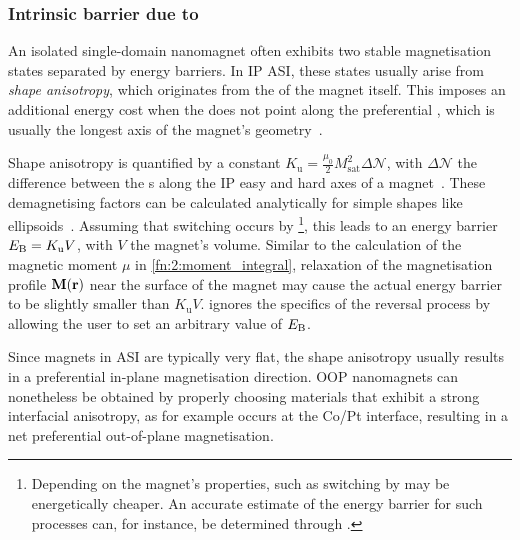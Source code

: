 \subsubsection{Intrinsic barrier due to }\label{sec:2:shape_anisotropy}
An isolated single-domain nanomagnet often exhibits two stable magnetisation states separated by energy barriers.
In IP ASI, these states usually arise from \textit{shape anisotropy}, which originates from the  of the magnet itself.
This imposes an additional energy cost when the  does not point along the preferential , which is usually the longest axis of the magnet's geometry~\cite{PhD_Leliaert}. \par
Shape anisotropy is quantified by a  constant $K_\mathrm{u} = \frac{\mu_0}{2} M_\mathrm{sat}^2 \Delta \mathcal{N}$, with $\Delta \mathcal{N}$ the difference between the s along the IP easy and hard axes of a magnet~\cite{AdvancesASI,VogelFulcherTammannFreezing,andersson2016thermally}. %
These demagnetising factors can be calculated analytically for simple shapes like ellipsoids~\cite{EllipsoidDemag,EllipseDemag}.
Assuming that switching occurs by \footnote{
	Depending on the magnet's properties,  such as switching by  may be energetically cheaper.
	An accurate estimate of the energy barrier for such processes can, for instance, be determined through .
}, this leads to an energy barrier $E_\mathrm{B} = K_\mathrm{u} V$, with $V$ the magnet's volume.
Similar to the calculation of the magnetic moment $\mu$ in \cref{fn:2:moment_integral}, relaxation of the magnetisation profile $\boldsymbol{\mathbf{M}}(\boldsymbol{\mathbf{r}})$ near the surface of the magnet may cause the actual energy barrier to be slightly smaller than $K_\mathrm{u} V$.
\hotspice ignores the specifics of the reversal process by allowing the user to set an arbitrary value of $E_\mathrm{B}$. \par
Since magnets in ASI are typically very flat, the shape anisotropy usually results in a preferential in-plane magnetisation direction.
OOP nanomagnets can nonetheless be obtained by properly choosing materials that exhibit a strong interfacial anisotropy, as for example occurs at the Co/Pt interface, resulting in a net preferential out-of-plane magnetisation.

